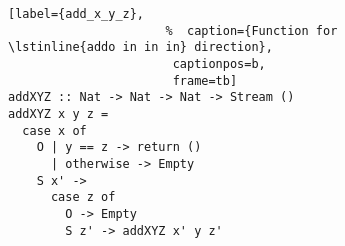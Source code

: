 \begin{figure}[!t]
  \centering
  \begin{minipage}{\columnwidth}
    \begin{lstlisting}[label={add_x_y_z},
                      %  caption={Function for \lstinline{addo in in in} direction},
                       captionpos=b,
                       frame=tb]
addXYZ :: Nat -> Nat -> Nat -> Stream ()
addXYZ x y z =
  case x of
    O | y == z -> return ()
      | otherwise -> Empty
    S x' ->
      case z of
        O -> Empty
        S z' -> addXYZ x' y z'
    \end{lstlisting}
  \end{minipage}
\end{figure}